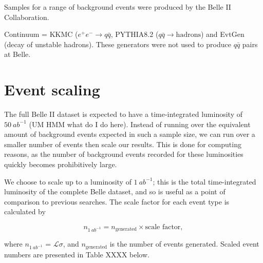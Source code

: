 \documentclass[12pt]{thesis}  %
\begin{document}
Samples for a range of background events were produced by the Belle II Collaboration. 

Continuum = KKMC ($e^+e^-\to q\bar{q}$, PYTHIA8.2 ($q\bar{q}\to\text{hadrons}$) and EvtGen (decay of unstable hadrons). These generators were not used to produce $q\bar{q}$ pairs at Belle.


\section{Event scaling}

The full Belle II dataset is expected to have a time-integrated luminosity of $\SI{50}{ab^{-1}}$ (UM HMM what do I do here). Instead of running over the equivalent amount of background events expected in such a sample size, we can run over a smaller number of events then scale our results. This is done for computing reasons, as the number of background events recorded for these luminosities quickly becomes prohibitively large.

We choose to scale up to a luminosity of $\SI{1}{ab^{-1}}$; this is the total time-integrated luminosity of the complete Belle dataset, and so is useful as a point of comparison to previous searches. The scale factor for each event type is calculated by

\begin{equation}
n_{\SI{1}{ab^{-1}}} = n_{\text{generated}} \times \text{scale factor},
\end{equation}

where $n_{\SI{1}{ab^{-1}}}$ = $\mathcal{L} \sigma$, and $n_{\text{generated}}$ is the number of events generated. Scaled event numbers are presented in Table XXXX below.
\end{document}
